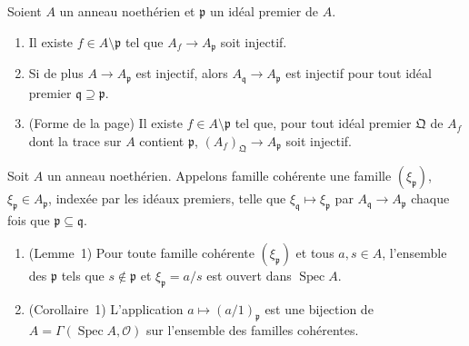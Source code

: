 \begin{enonce}
Soient $A$ un anneau noethérien et $\mathfrak p$ un idéal premier de $A$.
\begin{enumerate}
\item Il existe $f \in A \setminus \mathfrak p$ tel que $A_f \to A_{\mathfrak p}$ soit injectif.
\item Si de plus $A \to A_{\mathfrak p}$ est injectif, alors $A_{\mathfrak q} \to A_{\mathfrak p}$ est injectif pour tout idéal premier $\mathfrak q \supseteq \mathfrak p$.
\item (Forme de la page) Il existe $f \in A \setminus \mathfrak p$ tel que, pour tout idéal premier $\mathfrak Q$ de $A_f$ dont la trace sur $A$ contient $\mathfrak p$, $(A_f)_{\mathfrak Q} \to A_{\mathfrak p}$ soit injectif.
\end{enumerate}
\end{enonce}

\begin{enonce}
Soit $A$ un anneau noethérien. Appelons famille cohérente une famille $(\xi_{\mathfrak p})$, $\xi_{\mathfrak p} \in A_{\mathfrak p}$, indexée par les idéaux premiers, telle que $\xi_{\mathfrak q} \mapsto \xi_{\mathfrak p}$ par $A_{\mathfrak q} \to A_{\mathfrak p}$ chaque fois que $\mathfrak p \subseteq \mathfrak q$.
\begin{enumerate}
\item (Lemme~1) Pour toute famille cohérente $(\xi_{\mathfrak p})$ et tous $a, s \in A$, l'ensemble des $\mathfrak p$ tels que $s \notin \mathfrak p$ et $\xi_{\mathfrak p} = a/s$ est ouvert dans $\operatorname{Spec} A$.
\item (Corollaire~1) L'application $a \mapsto (a/1)_{\mathfrak p}$ est une bijection de $A = \Gamma(\operatorname{Spec} A, \mathcal O)$ sur l'ensemble des familles cohérentes.
\end{enumerate}
\end{enonce}

